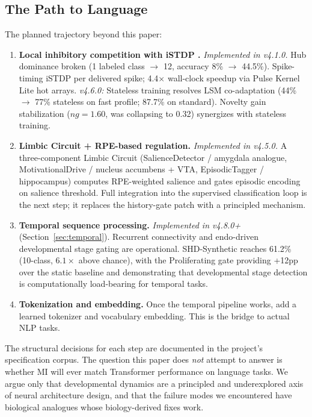 \subsection{The Path to Language}

The planned trajectory beyond this paper:
\begin{enumerate}
  \item \textbf{Local inhibitory competition with iSTDP \cite{vogels2011inhibitory}.} \textit{Implemented in v4.1.0.} Hub dominance broken (1 labeled class $\rightarrow$ 12, accuracy 8\% $\rightarrow$ 44.5\%). Spike-timing iSTDP per delivered spike; 4.4$\times$ wall-clock speedup via Pulse Kernel Lite hot arrays. \textit{v4.6.0:} Stateless training resolves LSM co-adaptation (44\% $\rightarrow$ 77\% stateless on fast profile; 87.7\% on standard). Novelty gain stabilization ($\mathit{ng}=1.60$, was collapsing to 0.32) synergizes with stateless training.
  \item \textbf{Limbic Circuit + RPE-based regulation.} \textit{Implemented in v4.5.0.} A three-component Limbic Circuit (SalienceDetector / amygdala analogue, MotivationalDrive / nucleus accumbens + VTA, EpisodicTagger / hippocampus) computes RPE-weighted salience and gates episodic encoding on salience threshold. Full integration into the supervised classification loop is the next step; it replaces the history-gate patch with a principled mechanism.
  \item \textbf{Temporal sequence processing.} \textit{Implemented in v4.8.0+} (Section~\ref{sec:temporal}). Recurrent connectivity and endo-driven developmental stage gating are operational. SHD-Synthetic reaches 61.2\% (10-class, $6.1\times$ above chance), with the Proliferating gate providing +12pp over the static baseline and demonstrating that developmental stage detection is computationally load-bearing for temporal tasks.
  \item \textbf{Tokenization and embedding.} Once the temporal pipeline works, add a learned tokenizer and vocabulary embedding. This is the bridge to actual NLP tasks.
\end{enumerate}

The structural decisions for each step are documented in the project's specification corpus. The question this paper does \emph{not} attempt to answer is whether MI will ever match Transformer performance on language tasks. We argue only that developmental dynamics are a principled and underexplored axis of neural architecture design, and that the failure modes we encountered have biological analogues whose biology-derived fixes work.
